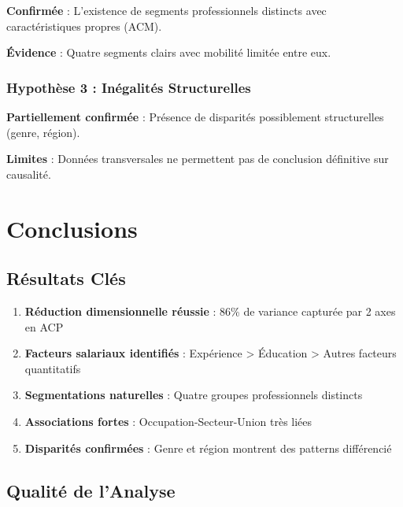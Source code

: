 \documentclass[12pt,a4paper]{report}
\begin{document}
\textbf{Confirmée} : L'existence de segments professionnels distincts avec caractéristiques propres (ACM).

\textbf{Évidence} : Quatre segments clairs avec mobilité limitée entre eux.

\subsubsection{Hypothèse 3 : Inégalités Structurelles}

\textbf{Partiellement confirmée} : Présence de disparités possiblement structurelles (genre, région).

\textbf{Limites} : Données transversales ne permettent pas de conclusion définitive sur causalité.

\section{Conclusions}

\subsection{Résultats Clés}

\begin{enumerate}
    \item \textbf{Réduction dimensionnelle réussie} : 86\% de variance capturée par 2 axes en ACP
    
    \item \textbf{Facteurs salariaux identifiés} : Expérience > Éducation > Autres facteurs quantitatifs
    
    \item \textbf{Segmentations naturelles} : Quatre groupes professionnels distincts
    
    \item \textbf{Associations fortes} : Occupation-Secteur-Union très liées
    
    \item \textbf{Disparités confirmées} : Genre et région montrent des patterns différencié
\end{enumerate}

\subsection{Qualité de l'Analyse}
\end{document}
